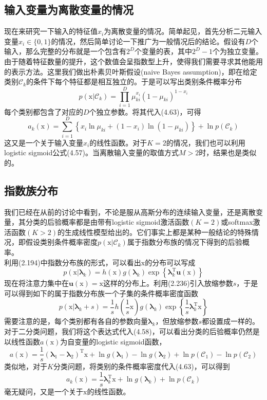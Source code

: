 \documentclass[b5paper]{book}
\numberwithin{equation}{chapter}
\newcommand {\bx} {\boldsymbol{\mathrm{x}}}
\newcommand {\rmT} {\mathrm{T}}
\newcommand {\bflambda} {\boldsymbol{\lambda}}
\newcommand {\calC} {\mathcal{C}}
\begin{document}
	\subsection{输入变量为离散变量的情况}
	\textnormal{现在来研究一下输入的特征值$x_i$为离散变量的情况。简单起见，首先分析二元输入变量$x_i \in \{0, 1\}$的情况，然后简单讨论一下推广为一般情况后的结论。假设有$D$个输入，那么完整的分布就是一个包含有$2^D$个变量的表，其中$2^D - 1$个为独立变量。由于随着特征数量的提升，这个数值会呈指数型上升，使得我们需要寻求其他能用的表示方法。这里我们做出朴素贝叶斯假设(naive Bayes assumption)，即在给定类别$\calC_k$的条件下每个特征都是相互独立的。于是可以写出类别条件概率分布
	\begin{equation}
		p(\bx|\calC_k) = \prod_{i=1}^D \mu_{ki}^{x_i}(1-\mu_{ki})^{1-x_i}
	\end{equation}
	每个类别都包含了对应的$D$个独立参数。将其代入(4.63)，可得
	\begin{equation}
		a_k(\bx) = \sum_{i=1}^D \left\{x_i \ln \mu_{ki} + (1-x_i)\ln (1-\mu_{ki})\right\}+\ln p(\calC_k)
	\end{equation}
	这又是一个关于输入变量$x_i$的线性函数。对于$K=2$的情况，我们也可以利用logistic sigmoid公式(4.57)。当离散输入变量的取值方式$M>2$时，结果也是类似的。
	}
	\subsection{指数族分布}
	\textnormal{我们已经在从前的讨论中看到，不论是服从高斯分布的连续输入变量，还是离散变量，其分类的后验概率都是由带有logistic sigmoid激活函数$(K=2)$或softmax激活函数$(K>2)$的生成线性模型给出的。它们事实上都是某种一般结论的特殊情况，即假设类别条件概率密度$p(\bx|\calC_k)$属于指数分布族的情况下得到的后验概率。\\
	\indent 利用(2.194)中指数分布族的形式，可以看出$\bx$的分布可以写成
	\begin{equation}
		p(\bx|\bflambda_k)=h(\bx)g(\bflambda_k)\exp \left\{\bflambda_k^{\rmT}\mathbf{u}(\bx)\right\}
	\end{equation}
	现在将注意力集中在$\mathbf{u}(\bx) = \bx$这样的分布上。利用(2.236)引入放缩参数$s$，于是可以得到如下的属于指数分布族一个子集的条件概率密度函数
	\begin{equation}
		p(\bx|\bflambda_k+s) = \frac{1}{s}h(\frac{1}{s}\bx)g(\bflambda_k)\exp \left\{\frac{1}{s}\bflambda_k^{\rmT}\bx\right\}
	\end{equation}
	需要注意的是，每个类别都有各自的参数向量$\bflambda_k$，但放缩参数$s$都设置成一样的。\\
	\indent 对于二分类问题，我们将这个表达式代入(4.58)，可以看出分类的后验概率仍然是以线性函数$a(\bx)$为自变量的logistic sigmoid函数，
	\begin{equation}
		a(\bx) = \frac{1}{s}(\bflambda_1 - \bflambda_2)^{\rmT}\bx + \ln g(\bflambda_1) - \ln g(\bflambda_2) + \ln p(\calC_1) - \ln p(\calC_2)
	\end{equation}
	类似地，对于$K$分类问题，将类别的条件概率密度代入(4.63)，可以得到
	\begin{equation}
		a_k(\bx) = \frac{1}{s}\bflambda_k^{\rmT}\bx + \ln g(\bflambda_k) + \ln p(\calC_k)
	\end{equation}
	毫无疑问，又是一个关于$\bx$的线性函数。
	}
\end{document}
